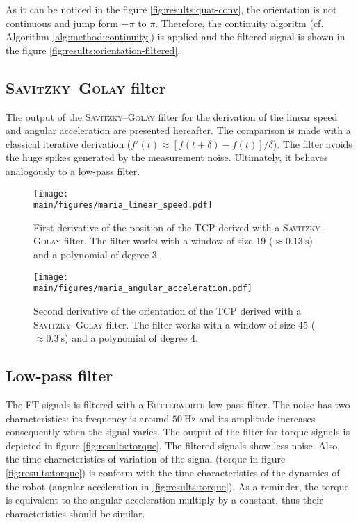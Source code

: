 \documentclass[/home/francois/latex/report/main.tex]{subfiles}
\begin{document}
As it can be noticed in the figure \ref{fig:results:quat-conv}, the orientation is not continuous and jump form $-\pi$ to $\pi$. Therefore, the continuity algoritm (cf. Algorithm \ref{alg:method:continuity}) is applied and the filtered signal is shown in the figure \ref{fig:results:orientation-filtered}.

\subsection{\textsc{Savitzky–Golay} filter}

The output of the \textsc{Savitzky–Golay} filter for the derivation of the linear speed and angular acceleration are presented hereafter. The comparison is made with a classical iterative derivation ($f'(t) \approx  [f(t+\delta) - f(t)] / \delta$). The filter avoids the huge spikes generated by the measurement noise. Ultimately, it behaves analogously to a low-pass filter.

\begin{figure}[h]
  \centering
  \texttt{[image: \\main/figures/maria\_linear\_speed.pdf]}
  \caption{First derivative of the position of the \ac{TCP} derived with a \textsc{Savitzky–Golay} filter. The filter works with a window of size 19 ($\approx 0.13 \ \si{\second}$) and a polynomial of degree 3.}
  \label{fig:results:linear-speed-filtered}
\end{figure}

\begin{figure}[h]
  \centering
  \texttt{[image: \\main/figures/maria\_angular\_acceleration.pdf]}
  \caption{Second derivative of the orientation of the \ac{TCP} derived with a \textsc{Savitzky–Golay} filter. The filter works with a window of size 45 ($\approx 0.3 \ \si{\second}$) and a polynomial of degree 4.}
  \label{fig:results:angular-acceleration-filtered}
\end{figure}


\subsection{Low-pass filter}

The \ac{FT} signals is filtered with a \textsc{Butterworth} low-pass filter. The noise has two characteristics: its frequency is around $50 \ \si{\hertz}$ and its amplitude increases consequently when the signal varies. The output of the filter for torque signals is depicted in figure \ref{fig:results:torque}. The filtered signals show less noise. Also, the time characteristics of variation of the signal (torque in figure \ref{fig:results:torque}) is conform with the time characteristics of the dynamics of the robot (angular acceleration in \ref{fig:results:torque}). As a reminder, the torque is equivalent to the angular acceleration multiply by a constant, thus their characteristics should be similar.
\end{document}
